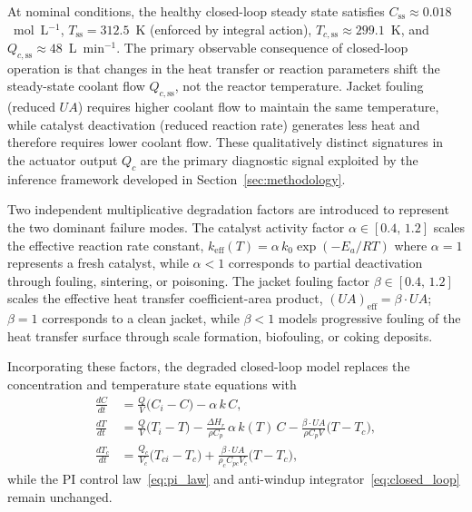 \documentclass[aps,pre,twocolumn,superscriptaddress]{revtex4-2}
\begin{document}
At nominal conditions, the healthy closed-loop steady state satisfies
$C_\mathrm{ss} \approx 0.018$~mol~L$^{-1}$,
$T_\mathrm{ss} = 312.5$~K (enforced by integral action),
$T_{c,\mathrm{ss}} \approx 299.1$~K, and
$Q_{c,\mathrm{ss}} \approx 48$~L~min$^{-1}$.
The primary observable consequence of closed-loop operation is that changes
in the heat transfer or reaction parameters shift the steady-state
coolant flow $Q_{c,\mathrm{ss}}$, not the reactor temperature. Jacket
fouling (reduced $U\!A$) requires higher coolant flow to maintain the
same temperature, while catalyst deactivation (reduced reaction rate)
generates less heat and therefore requires lower coolant flow. These
qualitatively distinct signatures in the actuator output $Q_c$ are the
primary diagnostic signal exploited by the inference framework developed
in Section~\ref{sec:methodology}.


Two independent multiplicative degradation factors are introduced to
represent the two dominant failure modes. The catalyst activity factor $\alpha \in [0.4,\,1.2]$ scales the effective
reaction rate constant, $k_\mathrm{eff}(T) = \alpha\,k_0\exp\!\left(-E_a / RT\right)$ where $\alpha = 1$
represents a fresh catalyst, while $\alpha < 1$ corresponds to partial
deactivation through fouling, sintering, or poisoning. The jacket fouling
factor $\beta \in [0.4,\,1.2]$ scales the effective heat transfer coefficient-area product, $(U\!A)_\mathrm{eff} = \beta\cdot U\!A$; $\beta = 1$
corresponds to a clean jacket, while $\beta < 1$ models progressive fouling of
the heat transfer surface through scale formation, biofouling, or coking deposits.

Incorporating these factors, the degraded closed-loop model replaces the
concentration and temperature state equations with
%
\begin{subequations}
\label{eq:closed_loop_degraded}
\begin{align}
  \frac{dC}{dt}
    &= \frac{Q}{V}\bigl(C_i - C\bigr)
       - \alpha\,k\,C,
  \label{eq:dC_faulted} \\[4pt]
  \frac{dT}{dt}
    &= \frac{Q}{V}\bigl(T_i - T\bigr)
       - \frac{\Delta H_r}{\rho C_p}\,\alpha\,k(T)\,C
       - \frac{\beta\cdot U\!A}{\rho C_p V}\bigl(T - T_c\bigr),
  \label{eq:dT_faulted} \\[4pt]
  \frac{dT_c}{dt}
    &= \frac{Q_c}{V_c}\bigl(T_{ci} - T_c\bigr)
       + \frac{\beta\cdot U\!A}{\rho_c C_{pc} V_c}\bigl(T - T_c\bigr),
  \label{eq:dTc_faulted}
\end{align}
\end{subequations}
%
while the PI control law~\eqref{eq:pi_law} and anti-windup
integrator~\eqref{eq:closed_loop} remain unchanged. 
\end{document}
